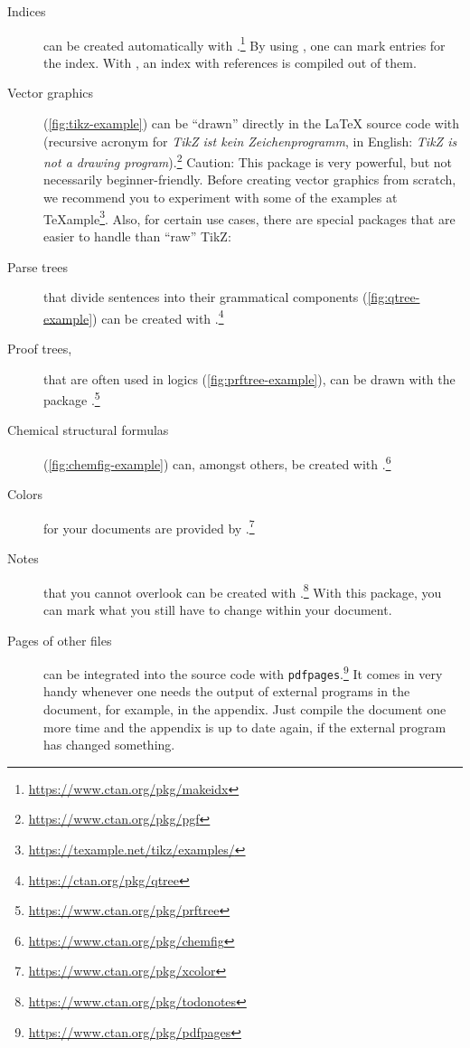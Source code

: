 \begin{description}
	\item[Indices]
		can be created automatically with .\footnote{\url{https://www.ctan.org/pkg/makeidx}}
		By using , one can mark entries for the index. With , an index with references is compiled out of them.
	\item[Vector graphics]
		(\cref{fig:tikz-example})
				can be \enquote{drawn} directly in the \LaTeX{} source code with  (recursive acronym for \emph{TikZ ist kein Zeichenprogramm}, in English: \emph{TikZ is not a drawing program}).\footnote{\url{https://www.ctan.org/pkg/pgf}}
		Caution: This package is very powerful, but not necessarily beginner-friendly.
		Before creating vector graphics from scratch, we recommend you to experiment with some of the examples at \TeX{}ample\footnote{\url{https://texample.net/tikz/examples/}}. 
		Also, for certain use cases, there are special packages that are easier to handle than \enquote{raw} TikZ:
	\item[Parse trees]
		that divide sentences into their grammatical components (\cref{fig:qtree-example}) can be created with .\footnote{\url{https://ctan.org/pkg/qtree}}
	\item[Proof trees,]
		that are often used in logics (\cref{fig:prftree-example}), can be drawn with the package .\footnote{\url{https://www.ctan.org/pkg/prftree}}
	\item[Chemical structural formulas]
		(\cref{fig:chemfig-example})
		can, amongst others, be created with  .\footnote{\url{https://www.ctan.org/pkg/chemfig}}
	\item[Colors]
		for your documents are provided by .\footnote{\url{https://www.ctan.org/pkg/xcolor}}
	\item[Notes]
		that you cannot overlook can be created with .\footnote{\url{https://www.ctan.org/pkg/todonotes}}
		With this package, you can mark what you still  have to change within your document.
	\item[Pages of other  files]
		can be integrated into the source code with \texttt{pdfpages}.\footnote{\url{https://www.ctan.org/pkg/pdfpages}}
		It comes in very handy whenever one needs the output of external programs in the document, for example, in the appendix.
		Just compile the document one more time and the appendix is up to date again, if the external program has changed something.

\end{description}
